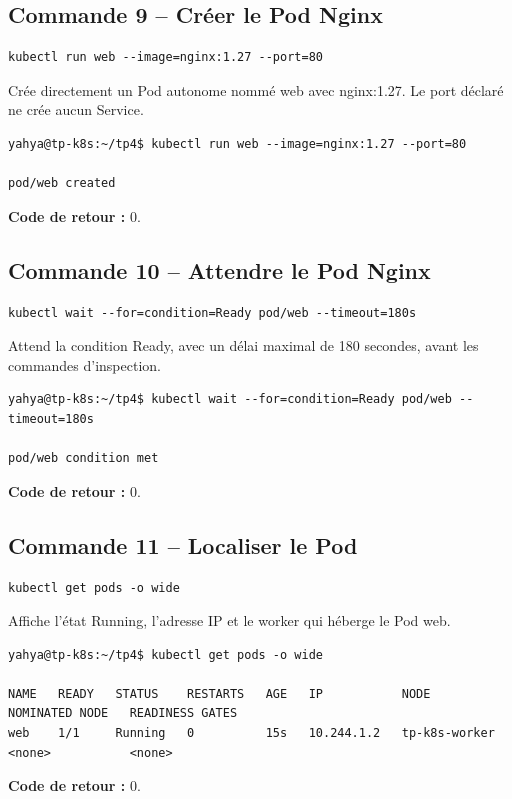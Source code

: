 \documentclass[11pt,a4paper]{article}
\begin{document}
\subsection{Commande 9 -- Créer le Pod Nginx}
\begin{lstlisting}
kubectl run web --image=nginx:1.27 --port=80
\end{lstlisting}
Crée directement un Pod autonome nommé web avec nginx:1.27. Le port déclaré ne crée aucun Service.
\begin{tcolorbox}[terminal,title={Ubuntu / WSL2 -- Commande 9 -- rendu reconstitué}]
\begin{Verbatim}[fontsize=\scriptsize,breaklines=true,breakanywhere=true,breaksymbolleft={},breaksymbolright={}]
yahya@tp-k8s:~/tp4$ kubectl run web --image=nginx:1.27 --port=80

pod/web created
\end{Verbatim}
\end{tcolorbox}
\textbf{Code de retour :} 0.

\subsection{Commande 10 -- Attendre le Pod Nginx}
\begin{lstlisting}
kubectl wait --for=condition=Ready pod/web --timeout=180s
\end{lstlisting}
Attend la condition Ready, avec un délai maximal de 180 secondes, avant les commandes d’inspection.
\begin{tcolorbox}[terminal,title={Ubuntu / WSL2 -- Commande 10 -- rendu reconstitué}]
\begin{Verbatim}[fontsize=\scriptsize,breaklines=true,breakanywhere=true,breaksymbolleft={},breaksymbolright={}]
yahya@tp-k8s:~/tp4$ kubectl wait --for=condition=Ready pod/web --timeout=180s

pod/web condition met
\end{Verbatim}
\end{tcolorbox}
\textbf{Code de retour :} 0.

\subsection{Commande 11 -- Localiser le Pod}
\begin{lstlisting}
kubectl get pods -o wide
\end{lstlisting}
Affiche l’état Running, l’adresse IP et le worker qui héberge le Pod web.
\begin{tcolorbox}[terminal,title={Ubuntu / WSL2 -- Commande 11 -- rendu reconstitué}]
\begin{Verbatim}[fontsize=\scriptsize,breaklines=true,breakanywhere=true,breaksymbolleft={},breaksymbolright={}]
yahya@tp-k8s:~/tp4$ kubectl get pods -o wide

NAME   READY   STATUS    RESTARTS   AGE   IP           NODE            NOMINATED NODE   READINESS GATES
web    1/1     Running   0          15s   10.244.1.2   tp-k8s-worker   <none>           <none>
\end{Verbatim}
\end{tcolorbox}
\textbf{Code de retour :} 0.
\end{document}
